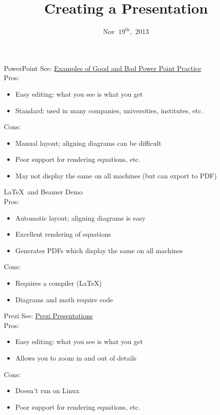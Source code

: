 \documentclass{beamer}
\title{Creating a Presentation}
\date{Nov~$19^{\text{th}}$,~2013}
\begin{document}
\begin{frame}
\titlepage
\end{frame}

\begin{frame}{PowerPoint}
See: \href{http://www.feg-consulting.com/resource/practitioners-guide-to-hea/annexes-practitioners-guide/chapter-5/annex-d/}{Examples of Good and Bad Power Point Practice}\\
\bigskip
Pros:
\begin{itemize}
\item Easy editing: what you see is what you get
\item Standard: used in many companies, universities, institutes, etc.
\end{itemize}
Cons:
\begin{itemize}
\item Manual layout; aligning diagrams can be difficult
\item Poor support for rendering equations, etc.
\item May not display the same on all machines (but can export to PDF)
\end{itemize}
\end{frame}

\begin{frame}{\LaTeX\ and Beamer}
Demo\\
\bigskip
Pros:
\begin{itemize}
\item Automatic layout; aligning diagrams is easy
\item Excellent rendering of equations
\item Generates PDFs which display the same on all machines
\end{itemize}
Cons:
\begin{itemize}
\item Requires a compiler (\LaTeX)
\item Diagrams and math require code
\end{itemize}
\end{frame}

\begin{frame}{Prezi}
See: \href{http://prezi.com/c9pdlrpx3pr6/copy-of-presentation-on-presentations/}{Prezi Presentations}\\
\bigskip
Pros:
\begin{itemize}
\item Easy editing: what you see is what you get
\item Allows you to zoom in and out of details
\end{itemize}
Cons:
\begin{itemize}
\item Doesn't run on Linux
\item Poor support for rendering equations, etc.
\end{itemize}
\end{frame}
\end{document}
